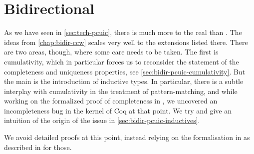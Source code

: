 \chapter{Bidirectional }
\label{chap:bidir-pcuic}

\margintoc

As we have seen in \cref{sec:tech-pcuic}, there is much more to the real  than
.
The ideas from \cref{chap:bidir-ccw} scales very well to the extensions listed there.
There are two areas, though, where some care needs to be taken.
The first is cumulativity, which in particular forces us to reconsider the statement
of the completeness and uniqueness properties, see \cref{sec:bidir-pcuic-cumulativity}.
But the main is the introduction of inductive types. In particular, there is a subtle
interplay with cumulativity in the treatment of pattern-matching,
and while working on the formalized proof of completeness in , we uncovered
an incompleteness bug in the kernel of Coq at that point.
We try and give an intuition of the origin of the issue in \cref{sec:bidir-pcuic-inductives}.

We avoid detailed proofs at this point,
instead relying on the formalisation in  as described in 
for those.


  
  
